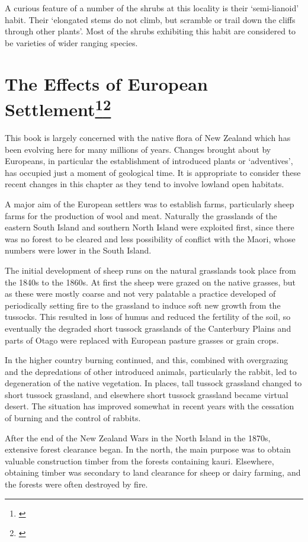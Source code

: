 A curious feature of a number of the shrubs at this locality is their `semi-lianoid' habit.
Their `elongated stems do not climb, but scramble or trail down the cliffs through other plants'.
Most of the shrubs exhibiting this habit are considered to be varieties of wider ranging species.

\section[The Effects of European Settlement]{The Effects of European Settlement\thinspace\footnote{\cite{healy1980flora}}\footnote{\cite{healy1969adventive}}}

This book is largely concerned with the native flora of New Zealand which has been evolving here for many millions of years.
Changes brought about by Europeans, in particular the establishment of introduced plants or `adventives', has occupied just a moment of geological time.
It is appropriate to consider these recent changes in this chapter as they tend to involve lowland open habitats.

A major aim of the European settlers was to establish farms, particularly sheep farms for the production of wool and meat.
Naturally the grasslands of the eastern South Island and southern North Island were exploited first, since there was no forest to be cleared and less possibility of conflict with the Maori, whose numbers were lower in the South Island.

The initial development of sheep runs on the natural grasslands took place from the 1840s to the 1860s.
At first the sheep were grazed on the native grasses, but as these were mostly coarse and not very palatable a practice developed of periodically setting fire to the grassland to induce soft new growth from the tussocks.
This resulted in loss of humus and reduced the fertility of the soil, so eventually the degraded short tussock grasslands of the Canterbury Plains and parts of Otago were replaced with European pasture grasses or grain crops.

In the higher country burning continued, and this, combined with overgrazing and the depredations of other introduced animals, particularly the rabbit, led to degeneration of the native vegetation.
In places, tall tussock grassland changed to short tussock grassland, and elsewhere short tussock grassland became virtual desert.
The situation has improved somewhat in recent years with the cessation of burning and the control of rabbits.

After the end of the New Zealand Wars in the North Island in the 1870s, extensive forest clearance began.
In the north, the main purpose was to obtain valuable construction timber from the forests containing kauri.
Elsewhere, obtaining timber was secondary to land clearance for sheep or dairy farming, and the forests were often destroyed by fire.

